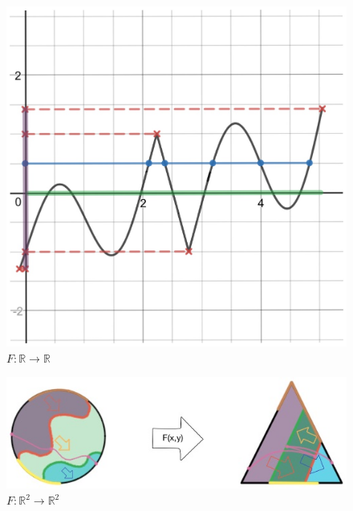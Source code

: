 \documentclass[11pt]{article}
\theoremstyle{plain}
\theoremstyle{definition}
\theoremstyle{remark}
\begin{document}
\begin{figure}[h] \label{fig1}
\begin{center}
\includegraphics[scale=0.15]{Figures/Curvea} 
\end{center}
\caption{$F:\mathbb{R}\rightarrow\mathbb{R}$}
\end{figure}
\begin{figure}[h] \label{fig2}
\begin{center}
\includegraphics[scale=0.5]{Figures/R2Exb}
\end{center}
\caption{$F:\mathbb{R}^2\rightarrow\mathbb{R}^2$}
\end{figure}
\end{document}
